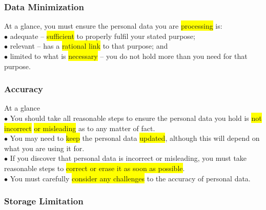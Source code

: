 \documentclass[tikz,border=10pt]{project_plan}
\newcommand{\bulletPoint}{\hspace{-3.1pt}$\bullet$ \hspace{5pt}}
\begin{document}
\newpage

\subsubsection{Data Minimization}

At a glance, you must ensure the personal data you are \colorbox{yellow}{processing} is:\\
\bulletPoint adequate – \colorbox{yellow}{sufficient} to properly fulfil your stated purpose;\\
\bulletPoint relevant – has a \colorbox{yellow}{rational link} to that purpose; and\\
\bulletPoint limited to what is \colorbox{yellow}{necessary} – you do not hold more than you need for that purpose.

\subsubsection{Accuracy}

At a glance\\
\bulletPoint You should take all reasonable steps to ensure the personal data you hold is \colorbox{yellow}{not incorrect} \colorbox{yellow}{or misleading} as to any matter of fact.\\
\bulletPoint You may need to \colorbox{yellow}{keep} the personal data \colorbox{yellow}{updated}, although this will depend on what you are using it for.\\
\bulletPoint If you discover that personal data is incorrect or misleading, you must take reasonable steps to \colorbox{yellow}{correct or erase it as soon as possible}.\\
\bulletPoint You must carefully \colorbox{yellow}{consider any challenges} to the accuracy of personal data.

\subsubsection{Storage Limitation}
\end{document}

